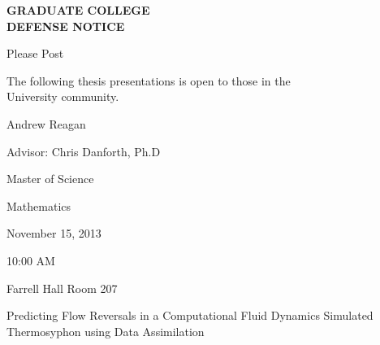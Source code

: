 \documentclass[12pt]{amsart}
\begin{document}

\begin{center}
{\Large {\bf GRADUATE COLLEGE\\ \vspace{5px}
DEFENSE NOTICE}}

\vspace{20px}
{\large
Please Post\\
\vspace{20px}

The following thesis presentations is open to those in the \\
University community.
\vspace{35px}

Andrew Reagan\\
\vspace{20px}

Advisor: Chris Danforth, Ph.D\\
\vspace{20px}

Master of Science\\
\vspace{20px}

Mathematics\\
\vspace{20px}

November 15, 2013\\
\vspace{20px}

10:00 AM\\
\vspace{20px}

Farrell Hall Room 207\\
\vspace{20px}

Predicting Flow Reversals in a Computational Fluid Dynamics Simulated Thermosyphon using Data Assimilation}

\end{center}
\end{document}
